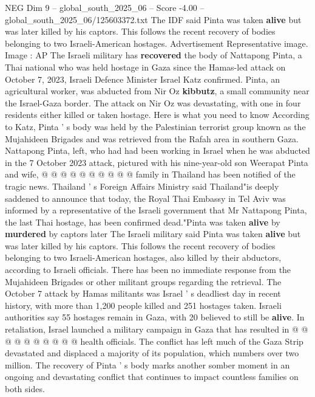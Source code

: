 \begin{textsample}{NEG Dim 9 – global\_south\_2025\_06 – Score -4.00 – global\_south\_2025\_06/125603372.txt}  \label{ex:f9_neg_260}
The IDF said Pinta was taken \textbf{alive} but was later killed by his captors.
This follows the recent recovery of bodies belonging to two Israeli-American hostages.
Advertisement Representative image.
Image : AP The Israeli military has \textbf{recovered} the body of Nattapong Pinta, a Thai national who was held hostage in Gaza since the Hamas-led attack on October 7, 2023, Israeli Defence Minister Israel Katz confirmed.
Pinta, an agricultural worker, was abducted from Nir Oz \textbf{kibbutz}, a small community near the Israel-Gaza border.
The attack on Nir Oz was devastating, with one in four residents either killed or taken hostage.
Here is what you need to know According to Katz, Pinta ' s body was held by the Palestinian terrorist group known as the Mujahideen Brigades and was retrieved from the Rafah area in southern Gaza.
Nattapong Pinta, left, who had had been working in Israel when he was abducted in the 7 October 2023 attack, pictured with his nine-year-old son Weerapat Pinta and wife, @ @ @ @ @ @ @ @ @ @ family in Thailand has been notified of the tragic news.
Thailand ' s Foreign Affairs Ministry said Thailand"is deeply saddened to announce that today, the Royal Thai Embassy in Tel Aviv was informed by a representative of the Israeli government that Mr Nattapong Pinta, the last Thai hostage, has been confirmed dead."Pinta was taken \textbf{alive} by \textbf{murdered} by captors later The Israeli military said Pinta was taken \textbf{alive} but was later killed by his captors.
This follows the recent recovery of bodies belonging to two Israeli-American hostages, also killed by their abductors, according to Israeli officials.
There has been no immediate response from the Mujahideen Brigades or other militant groups regarding the retrieval.
The October 7 attack by Hamas militants was Israel ' s deadliest day in recent history, with more than 1,200 people killed and 251 hostages taken.
Israeli authorities say 55 hostages remain in Gaza, with 20 believed to still be \textbf{alive}.
In retaliation, Israel launched a military campaign in Gaza that has resulted in @ @ @ @ @ @ @ @ @ @ health officials.
The conflict has left much of the Gaza Strip devastated and displaced a majority of its population, which numbers over two million.
The recovery of Pinta ' s body marks another somber moment in an ongoing and devastating conflict that continues to impact countless families on both sides.

\end{textsample}
